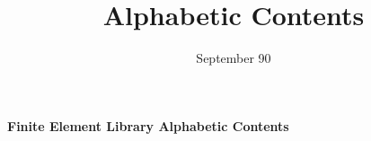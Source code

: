 \title{Alphabetic Contents}    %
\date{September 90}    %

%
\vskip 10pt
\begin{center}                                          %
\Large\bf                                              %
Finite Element Library Alphabetic Contents             %
\vskip 10pt\small\noindent                      
\end{center}                                            %


